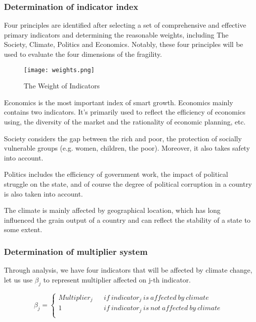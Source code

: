 \documentclass{mcmthesis}
\begin{document}
			\subsubsection{Determination of indicator index}
		
				Four principles are identified after selecting a set of comprehensive and effective primary indicators and determining the reasonable weights, including The Society, Climate, Politics and Economics. Notably, these four principles will be used to evaluate the four dimensions of the fragility.
				
				\begin{figure}[h]
					\small
					\centering
					\texttt{[image: weights.png]}
					\caption{The Weight of Indicators}
					\label{fig:weights}
				\end{figure}
				
				Economics is the most important index of smart growth. Economics mainly contains two indicators. It’s primarily used to reflect the efficiency of economics using,
				the diversity of the market and the rationality of economic planning, etc.
				
				Society considers the gap between the rich and poor, the protection of socially vulnerable groups (e.g. women, children, the poor). Moreover, it also takes safety into account.
				
				Politics includes the efficiency of government work, the impact of political struggle on the state, and of course the degree of political corruption in a country is also taken into account.
				
				The climate is mainly affected by geographical location, which has long influenced the grain output of a country and can reflect the stability of a state to some extent.
			
				
			
			\subsubsection{Determination of multiplier system}
			
				Through analysis, we have four indicators that will be affected by climate change, let us use $\beta_{j}$ to represent multiplier affected on j-th indicator.
				
				$$ 
				\beta_{j}=\left\{
				\begin{array}{rcl}
				Multiplier_{j}       &      & if \ indicator_{j} \ is \ affected \ by \ climate \\
				1     &      & if \ indicator_{j} \ is \ not \ affected \ by \ climate\\
				\end{array} \right. 
				$$ 
				
\end{document}
